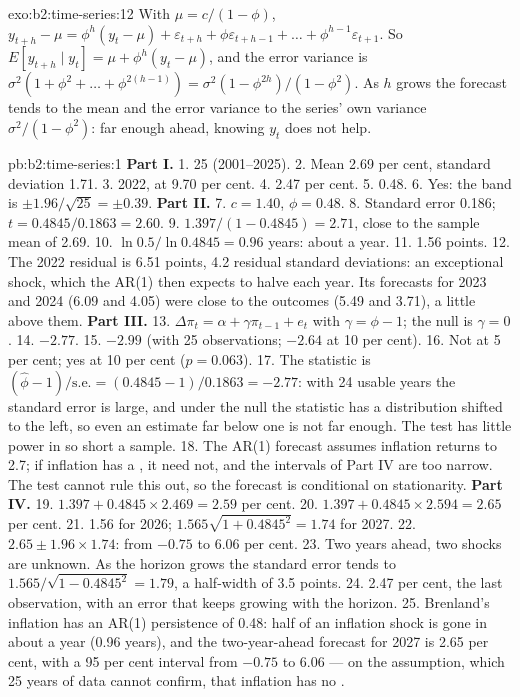 \begin{solution}{exo:b2:time-series:12}
With $\mu = c/(1 - \phi)$, $y_{t+h} - \mu = \phi^h(y_t - \mu) + \varepsilon_{t+h} + \phi\varepsilon_{t+h-1} + \dots +
\phi^{h-1}\varepsilon_{t+1}$. So $E[y_{t+h} \mid y_t] = \mu + \phi^h(y_t - \mu)$, and the error variance is
$\sigma^2(1 + \phi^2 + \dots + \phi^{2(h-1)}) = \sigma^2(1 - \phi^{2h})/(1 - \phi^2)$. As $h$ grows the forecast tends to
the mean and the error variance to the series' own variance $\sigma^2/(1 - \phi^2)$: far enough ahead, knowing $y_t$ does
not help.
\end{solution}

\begin{solution}{pb:b2:time-series:1}
\textbf{Part I.}
1. 25 (2001--2025).
2. Mean 2.69 per cent, standard deviation 1.71.
3. 2022, at 9.70 per cent.
4. 2.47 per cent.
5. 0.48.
6. Yes: the band is $\pm1.96/\sqrt{25} = \pm0.39$.
\textbf{Part II.}
7. $c = 1.40$, $\phi = 0.48$.
8. Standard error 0.186; $t = 0.4845/0.1863 = 2.60$.
9. $1.397/(1 - 0.4845) = 2.71$, close to the sample mean of 2.69.
10. $\ln 0.5/\ln 0.4845 = 0.96$ years: about a year.
11. 1.56 points.
12. The 2022 residual is 6.51 points, 4.2 residual standard deviations: an exceptional shock, which the AR(1) then expects
to halve each year. Its forecasts for 2023 and 2024 (6.09 and 4.05) were close to the outcomes (5.49 and 3.71), a little
above them.
\textbf{Part III.}
13. $\Delta\pi_t = \alpha + \gamma\pi_{t-1} + e_t$ with $\gamma = \phi - 1$; the null is $\gamma = 0$.
14. $-2.77$.
15. $-2.99$ (with 25 observations; $-2.64$ at 10 per cent).
16. Not at 5 per cent; yes at 10 per cent ($p = 0.063$).
17. The statistic is $(\hat\phi - 1)/\mathrm{s.e.} = (0.4845 - 1)/0.1863 = -2.77$: with 24 usable years the standard error is
large, and under the null the statistic has a distribution shifted to the left, so even an estimate far below one is not
far enough. The test has little power in so short a sample.
18. The AR(1) forecast assumes inflation returns to 2.7; if inflation has a , it need not, and the intervals of
Part IV are too narrow. The test cannot rule this out, so the forecast is conditional on stationarity.
\textbf{Part IV.}
19. $1.397 + 0.4845 \times 2.469 = 2.59$ per cent.
20. $1.397 + 0.4845 \times 2.594 = 2.65$ per cent.
21. 1.56 for 2026; $1.565\sqrt{1 + 0.4845^2} = 1.74$ for 2027.
22. $2.65 \pm 1.96 \times 1.74$: from $-0.75$ to 6.06 per cent.
23. Two years ahead, two shocks are unknown. As the horizon grows the standard error tends to $1.565/\sqrt{1 - 0.4845^2} =
1.79$, a half-width of 3.5 points.
24. 2.47 per cent, the last observation, with an error that keeps growing with the horizon.
25. Brenland's inflation has an AR(1) persistence of 0.48: half of an inflation shock is gone in about a year (0.96 years),
and the two-year-ahead forecast for 2027 is 2.65 per cent, with a 95 per cent interval from $-0.75$ to 6.06 --- on the
assumption, which 25 years of data cannot confirm, that inflation has no .
\end{solution}
